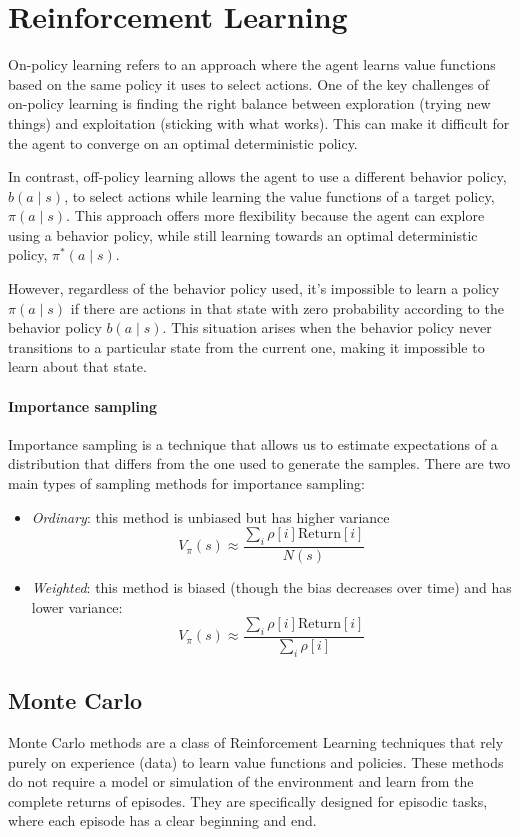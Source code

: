 \section{Reinforcement Learning}

On-policy learning refers to an approach where the agent learns value functions based on the same policy it uses to select actions.
One of the key challenges of on-policy learning is finding the right balance between exploration (trying new things) and exploitation (sticking with what works). 
This can make it difficult for the agent to converge on an optimal deterministic policy.

In contrast, off-policy learning allows the agent to use a different behavior policy, $b(a\mid s)$, to select actions while learning the value functions of a target policy, $\pi(a\mid s)$. 
This approach offers more flexibility because the agent can explore using a behavior policy, while still learning towards an optimal deterministic policy, $\pi^\ast(a\mid s)$.

However, regardless of the behavior policy used, it's impossible to learn a policy $\pi(a\mid s)$ if there are actions in that state with zero probability according to the behavior policy $b(a\mid s)$. 
This situation arises when the behavior policy never transitions to a particular state from the current one, making it impossible to learn about that state.

\paragraph*{Importance sampling}
Importance sampling is a technique that allows us to estimate expectations of a distribution that differs from the one used to generate the samples.
There are two main types of sampling methods for importance sampling:
\begin{itemize}
    \item \textit{Ordinary}: this method is unbiased but has higher variance
        \[V_{\pi}(s)\approx\dfrac{\sum_i\rho[i]\text{Return}[i]}{N(s)}\]
    \item \textit{Weighted}: this method is biased (though the bias decreases over time) and has lower variance:
    \[V_{\pi}(s)\approx\dfrac{\sum_i\rho[i]\text{Return}[i]}{\sum_i\rho[i]}\]
\end{itemize}

\subsection{Monte Carlo}
Monte Carlo methods are a class of Reinforcement Learning techniques that rely purely on experience (data) to learn value functions and policies. 
These methods do not require a model or simulation of the environment and learn from the complete returns of episodes. 
They are specifically designed for episodic tasks, where each episode has a clear beginning and end.


